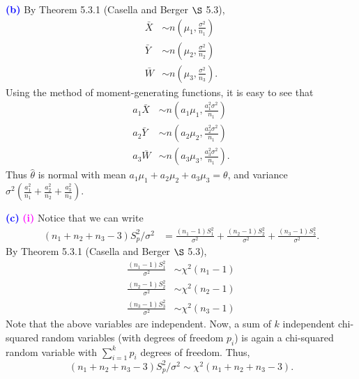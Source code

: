 \documentclass[12pt]{article}
\begin{document}
\vspace{3mm}

\noindent \textcolor{blue}{\textbf{(b)}} By Theorem 5.3.1 (Casella and Berger $\S$ 5.3),
\begin{align}
\bar{X} &\sim n\left(\mu_1, \frac{\sigma^2}{n_1} \right) \\
\bar{Y} &\sim n\left(\mu_2, \frac{\sigma^2}{n_2} \right) \\
\bar{W} &\sim n\left(\mu_3, \frac{\sigma^2}{n_3} \right).
\end{align}
Using the method of moment-generating functions, it is easy to see that
\begin{align}
a_1\bar{X} &\sim n\left(a_1\mu_1, \frac{a_1^2\sigma^2}{n_1}\right) \\
a_2\bar{Y} &\sim n\left(a_2\mu_2, \frac{a_2^2\sigma^2}{n_1}\right) \\
a_3\bar{W} &\sim n\left(a_3\mu_3, \frac{a_3^2\sigma^2}{n_1}\right).
\end{align}
Thus $\hat{\theta}$ is normal with mean $a_1\mu_1 + a_2\mu_2 + a_3\mu_3 = \theta$, and variance $\sigma^2\left(\frac{a_1^2}{n_1} + \frac{a_2^2}{n_2} + \frac{a_3^2}{n_3}\right)$.

\vspace{3mm}

\noindent \textcolor{blue}{\textbf{(c)}} \textcolor{magenta}{\textbf{(i)}} Notice that we can write
\begin{align}
(n_1+n_2+n_3-3)S_p^2/\sigma^2 &= \frac{(n_1-1)S_1^2}{\sigma^2} + \frac{(n_2-1)S_2^2}{\sigma^2} + \frac{(n_3-1)S_3^2}{\sigma^2}.
\end{align}
By Theorem 5.3.1 (Casella and Berger $\S$ 5.3),
\begin{align}
\frac{(n_1-1)S_1^2}{\sigma^2} &\sim \chi^2(n_1-1) \\
\frac{(n_2-1)S_2^2}{\sigma^2} &\sim \chi^2(n_2-1) \\
\frac{(n_3-1)S_3^2}{\sigma^2} &\sim \chi^2(n_3-1)
\end{align}
Note that the above variables are independent. Now, a sum of $k$ independent chi-squared random variables (with degrees of freedom $p_i$) is again a chi-squared random variable with $\sum\limits_{i=1}^k p_i$ degrees of freedom. Thus, $$(n_1+n_2+n_3-3)S_p^2/\sigma^2 \sim \chi^2\left(n_1+n_2+n_3-3\right).$$

\vspace{3mm}
\end{document}
